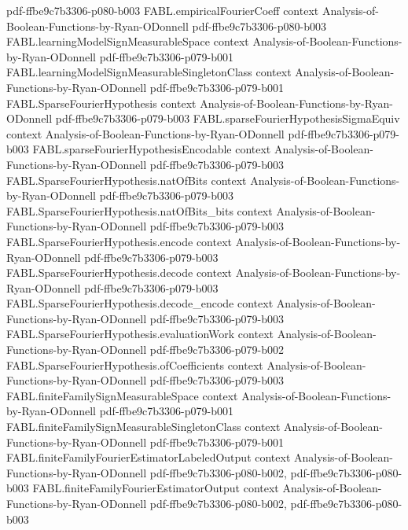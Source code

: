 \begin{theorem}
  {pdf-ffbe9c7b3306-p080-b003}
\proofstep
  {FABL.empiricalFourierCoeff}
  {context}
  {Analysis-of-Boolean-Functions-by-Ryan-ODonnell}
  {pdf-ffbe9c7b3306-p080-b003}
\proofstep
  {FABL.learningModelSignMeasurableSpace}
  {context}
  {Analysis-of-Boolean-Functions-by-Ryan-ODonnell}
  {pdf-ffbe9c7b3306-p079-b001}
\proofstep
  {FABL.learningModelSignMeasurableSingletonClass}
  {context}
  {Analysis-of-Boolean-Functions-by-Ryan-ODonnell}
  {pdf-ffbe9c7b3306-p079-b001}
\proofstep
  {FABL.SparseFourierHypothesis}
  {context}
  {Analysis-of-Boolean-Functions-by-Ryan-ODonnell}
  {pdf-ffbe9c7b3306-p079-b003}
\proofstep
  {FABL.sparseFourierHypothesisSigmaEquiv}
  {context}
  {Analysis-of-Boolean-Functions-by-Ryan-ODonnell}
  {pdf-ffbe9c7b3306-p079-b003}
\proofstep
  {FABL.sparseFourierHypothesisEncodable}
  {context}
  {Analysis-of-Boolean-Functions-by-Ryan-ODonnell}
  {pdf-ffbe9c7b3306-p079-b003}
\proofstep
  {FABL.SparseFourierHypothesis.natOfBits}
  {context}
  {Analysis-of-Boolean-Functions-by-Ryan-ODonnell}
  {pdf-ffbe9c7b3306-p079-b003}
\proofstep
  {FABL.SparseFourierHypothesis.natOfBits_bits}
  {context}
  {Analysis-of-Boolean-Functions-by-Ryan-ODonnell}
  {pdf-ffbe9c7b3306-p079-b003}
\proofstep
  {FABL.SparseFourierHypothesis.encode}
  {context}
  {Analysis-of-Boolean-Functions-by-Ryan-ODonnell}
  {pdf-ffbe9c7b3306-p079-b003}
\proofstep
  {FABL.SparseFourierHypothesis.decode}
  {context}
  {Analysis-of-Boolean-Functions-by-Ryan-ODonnell}
  {pdf-ffbe9c7b3306-p079-b003}
\proofstep
  {FABL.SparseFourierHypothesis.decode_encode}
  {context}
  {Analysis-of-Boolean-Functions-by-Ryan-ODonnell}
  {pdf-ffbe9c7b3306-p079-b003}
\proofstep
  {FABL.SparseFourierHypothesis.evaluationWork}
  {context}
  {Analysis-of-Boolean-Functions-by-Ryan-ODonnell}
  {pdf-ffbe9c7b3306-p079-b002}
\proofstep
  {FABL.SparseFourierHypothesis.ofCoefficients}
  {context}
  {Analysis-of-Boolean-Functions-by-Ryan-ODonnell}
  {pdf-ffbe9c7b3306-p079-b003}
\proofstep
  {FABL.finiteFamilySignMeasurableSpace}
  {context}
  {Analysis-of-Boolean-Functions-by-Ryan-ODonnell}
  {pdf-ffbe9c7b3306-p079-b001}
\proofstep
  {FABL.finiteFamilySignMeasurableSingletonClass}
  {context}
  {Analysis-of-Boolean-Functions-by-Ryan-ODonnell}
  {pdf-ffbe9c7b3306-p079-b001}
\proofstep
  {FABL.finiteFamilyFourierEstimatorLabeledOutput}
  {context}
  {Analysis-of-Boolean-Functions-by-Ryan-ODonnell}
  {pdf-ffbe9c7b3306-p080-b002,
    pdf-ffbe9c7b3306-p080-b003}
\proofstep
  {FABL.finiteFamilyFourierEstimatorOutput}
  {context}
  {Analysis-of-Boolean-Functions-by-Ryan-ODonnell}
  {pdf-ffbe9c7b3306-p080-b002,
    pdf-ffbe9c7b3306-p080-b003}

\end{theorem}
